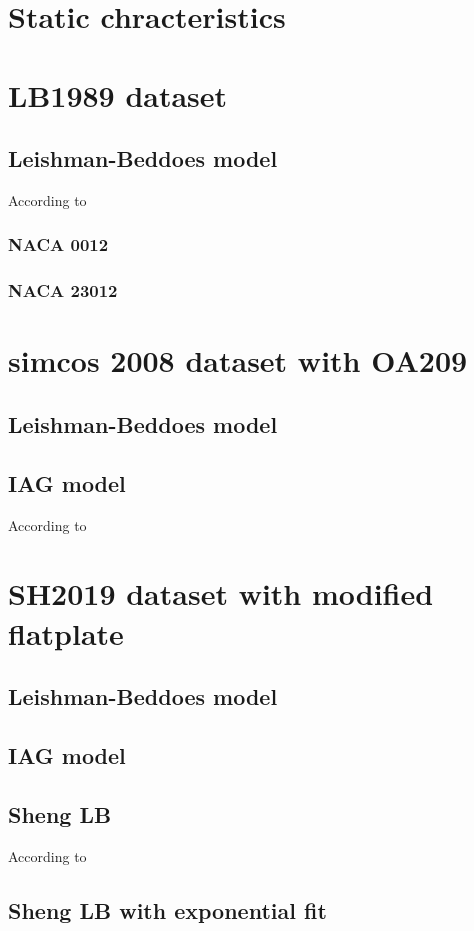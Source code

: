 
\section{Static chracteristics}

\section{LB1989 dataset}

\subsection{Leishman-Beddoes model}

According to \cite{leishman_semi-empirical_1989}

\subsubsection{NACA 0012}

\subsubsection{NACA 23012}

\section{simcos 2008 dataset with OA209}

\subsection{Leishman-Beddoes model}

\subsection{IAG model}

According to \cite{bangga_improved_2020}

\section{SH2019 dataset with modified flatplate}

\subsection{Leishman-Beddoes model}

\subsection{IAG model}

\subsection{Sheng LB}

According to \cite{sheng_modified_2008}

\subsection{Sheng LB with exponential fit}

